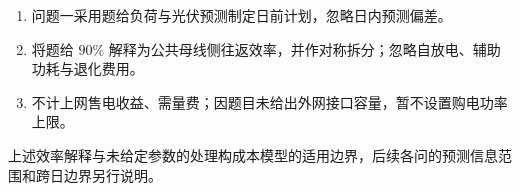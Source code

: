 \begin{enumerate}[label=假设\arabic*：,leftmargin=4.7em,labelsep=0.4em,itemsep=0.2em]
\item 问题一采用题给负荷与光伏预测制定日前计划，忽略日内预测偏差。
\item 将题给 $90\%$ 解释为公共母线侧往返效率，并作对称拆分；忽略自放电、辅助功耗与退化费用。
\item 不计上网售电收益、需量费；因题目未给出外网接口容量，暂不设置购电功率上限。
\end{enumerate}
上述效率解释与未给定参数的处理构成本模型的适用边界，后续各问的预测信息范围和跨日边界另行说明。
